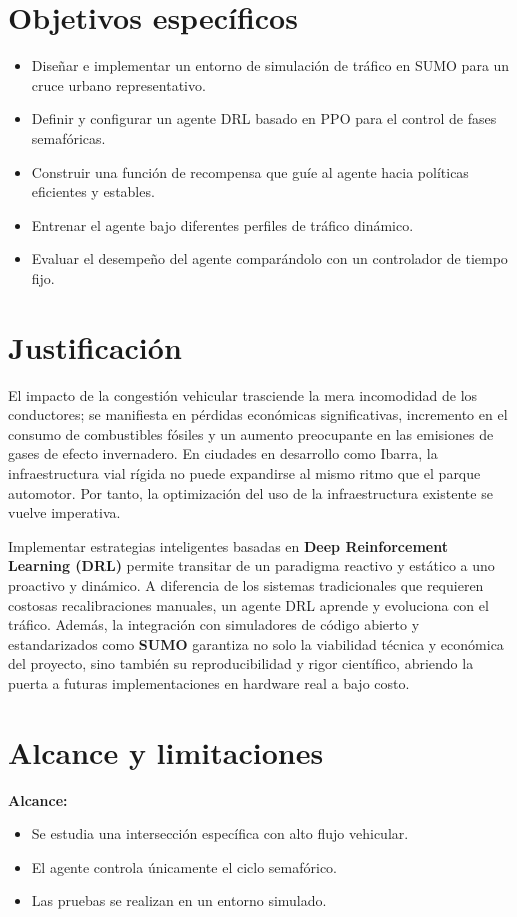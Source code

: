 \documentclass[12pt, a4paper]{report}
\begin{document}
\section*{Objetivos específicos}
\begin{itemize}
    \item Diseñar e implementar un entorno de simulación de tráfico en SUMO para un cruce urbano representativo.
    \item Definir y configurar un agente DRL basado en PPO para el control de fases semafóricas.
    \item Construir una función de recompensa que guíe al agente hacia políticas eficientes y estables.
    \item Entrenar el agente bajo diferentes perfiles de tráfico dinámico.
    \item Evaluar el desempeño del agente comparándolo con un controlador de tiempo fijo.
\end{itemize}

\section*{Justificación}
El impacto de la congestión vehicular trasciende la mera incomodidad de los conductores; se manifiesta en pérdidas económicas significativas, incremento en el consumo de combustibles fósiles y un aumento preocupante en las emisiones de gases de efecto invernadero. En ciudades en desarrollo como Ibarra, la infraestructura vial rígida no puede expandirse al mismo ritmo que el parque automotor. Por tanto, la optimización del uso de la infraestructura existente se vuelve imperativa.

Implementar estrategias inteligentes basadas en \textbf{Deep Reinforcement Learning (DRL)} permite transitar de un paradigma reactivo y estático a uno proactivo y dinámico. A diferencia de los sistemas tradicionales que requieren costosas recalibraciones manuales, un agente DRL aprende y evoluciona con el tráfico. Además, la integración con simuladores de código abierto y estandarizados como \textbf{SUMO} garantiza no solo la viabilidad técnica y económica del proyecto, sino también su reproducibilidad y rigor científico, abriendo la puerta a futuras implementaciones en hardware real a bajo costo.

\section*{Alcance y limitaciones}
\textbf{Alcance:}
\begin{itemize}
    \item Se estudia una intersección específica con alto flujo vehicular.
    \item El agente controla únicamente el ciclo semafórico.
    \item Las pruebas se realizan en un entorno simulado.
\end{itemize}
\end{document}
